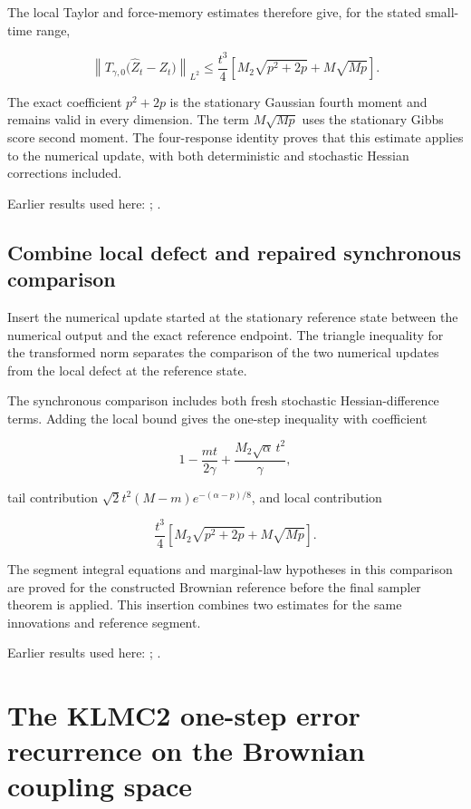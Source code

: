 \documentclass[11pt,a4paper]{report}
\begin{document}
The local Taylor and force-memory estimates therefore give, for the stated small-time range,

\[\left\|T_{\gamma,0}\bigl(\widehat Z_t-Z_t\bigr)\right\|_{L^2}\le\frac{t^3}{4}\left[M_2\sqrt{p^2+2p}+M\sqrt{Mp}\right].\]

The exact coefficient \(p^2+2p\) is the stationary Gaussian fourth moment and remains valid in every dimension. The term \(M\sqrt{Mp}\) uses the stationary Gibbs score second moment. The four-response identity proves that this estimate applies to the numerical update, with both deterministic and stochastic Hessian corrections included.



Earlier results used here: \cite[Section~3.13.2]{LangevinLean2026ULASC}; \cite[Section~3.8.17]{LangevinLean2026ULASC}.
\subsection{\texorpdfstring{Combine local defect and repaired synchronous comparison}{Combine local defect and repaired synchronous comparison}}
\label{report-step-KineticLangevin-SecondOrderOneStep-lean-3}


Insert the numerical update started at the stationary reference state between the numerical output and the exact reference endpoint. The triangle inequality for the transformed norm separates the comparison of the two numerical updates from the local defect at the reference state.



The synchronous comparison includes both fresh stochastic Hessian-difference terms. Adding the local bound gives the one-step inequality with coefficient

\[1-\frac{mt}{2\gamma}+\frac{M_2\sqrt\alpha\,t^2}{\gamma},\]

tail contribution \(\sqrt2t^2(M-m)e^{-(\alpha-p)/8}\), and local contribution

\[\frac{t^3}{4}\left[M_2\sqrt{p^2+2p}+M\sqrt{Mp}\right].\]

The segment integral equations and marginal-law hypotheses in this comparison are proved for the constructed Brownian reference before the final sampler theorem is applied. This insertion combines two estimates for the same innovations and reference segment.



Earlier results used here: \cite[Section~3.13.2]{LangevinLean2026ULASC}; \cite[Section~3.8.17]{LangevinLean2026ULASC}.
\section{\texorpdfstring{The KLMC2 one-step error recurrence on the Brownian coupling space}{The KLMC2 one-step error recurrence on the Brownian coupling space}}
\label{proof-module-KineticLangevin-CanonicalKLMC2Recurrence-lean}
\end{document}
